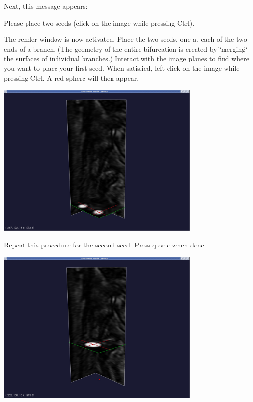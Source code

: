 Next, this message appears\+: 
\begin{DoxyCode}
Please place two seeds (click on the image \textcolor{keywordflow}{while} pressing Ctrl).
\end{DoxyCode}


The render window is now activated. Place the two seeds, one at each of the two ends of a branch. (The geometry of the entire bifurcation is created by \char`\"{}merging\char`\"{} the surfaces of individual branches.) Interact with the image planes to find where you want to place your first seed. When satisfied, left-\/click on the image while pressing {\ttfamily Ctrl}. A red sphere will then appear.

 
\begin{DoxyImageNoCaption}
  \mbox{\includegraphics[width=0.75\textwidth]{seed1}}
\end{DoxyImageNoCaption}


Repeat this procedure for the second seed. Press {\ttfamily q} or {\ttfamily e} when done.

 
\begin{DoxyImageNoCaption}
  \mbox{\includegraphics[width=0.75\textwidth]{seed2}}
\end{DoxyImageNoCaption}


